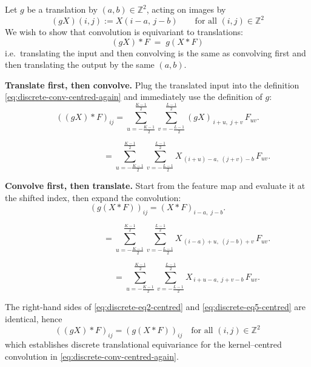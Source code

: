 \documentclass[12pt]{article}
\begin{document}
  Let $g$ be a translation by $(a,b) \in \mathbb{Z}^2$, acting on images
  by
  \[
    (gX)(i,j) := X(i-a,\,j-b)
    \qquad\text{for all }(i,j)\in\mathbb{Z}^2
  \]
  We wish to show that convolution is equivariant to translations:
  \[
    (gX) * F \;=\; g(X * F)
  \]
  i.e.\ translating the input and then convolving is the same as
  convolving first and then translating the output by the same $(a,b)$.
  
  \textbf{Translate first, then convolve.}  Plug the translated input into
  the definition \eqref{eq:discrete-conv-centred-again} and immediately
  use the definition of $g$:
\begin{equation}
\label{eq:discrete-eq1-centred}
((g X) * F)_{ij}
  =
  \sum_{u = -\frac{K-1}{2}}^{\frac{K-1}{2}}
  \sum_{v = -\frac{L-1}{2}}^{\frac{L-1}{2}}
  (g X)_{\,i+u,\; j+v}\, F_{uv}.
\end{equation}

\begin{equation}
\label{eq:discrete-eq2-centred}
\phantom{((g X) * F)_{ij}}
  =
  \sum_{u = -\frac{K-1}{2}}^{\frac{K-1}{2}}
  \sum_{v = -\frac{L-1}{2}}^{\frac{L-1}{2}}
  X_{\, (i+u)-a,\; (j+v)-b}\, F_{uv}.
\end{equation}
  
  \textbf{Convolve first, then translate.}  Start from the feature map and
  evaluate it at the shifted index, then expand the convolution:
\begin{equation}
\label{eq:discrete-eq3-centred}
(g (X * F))_{ij}
  = (X * F)_{i-a,\; j-b}.
\end{equation}

\begin{equation}
\label{eq:discrete-eq4-centred}
\phantom{(g (X * F))_{ij}}
  =
  \sum_{u = -\frac{K-1}{2}}^{\frac{K-1}{2}}
  \sum_{v = -\frac{L-1}{2}}^{\frac{L-1}{2}}
  X_{\, (i-a)+u,\; (j-b)+v}\, F_{uv}.
\end{equation}

\begin{equation}
\label{eq:discrete-eq5-centred}
\phantom{(g (X * F))_{ij}}
  =
  \sum_{u = -\frac{K-1}{2}}^{\frac{K-1}{2}}
  \sum_{v = -\frac{L-1}{2}}^{\frac{L-1}{2}}
  X_{\, i+u-a,\; j+v-b}\, F_{uv}.
\end{equation}
  
  The right-hand sides of \eqref{eq:discrete-eq2-centred} and
  \eqref{eq:discrete-eq5-centred} are identical, hence
  \[
  ((g X) * F)_{ij} = (g (X * F))_{ij}
  \quad\text{for all }(i,j)\in\mathbb{Z}^2
  \]
  which establishes discrete translational equivariance for the
  kernel--centred convolution in \eqref{eq:discrete-conv-centred-again}.
  
\end{document}
